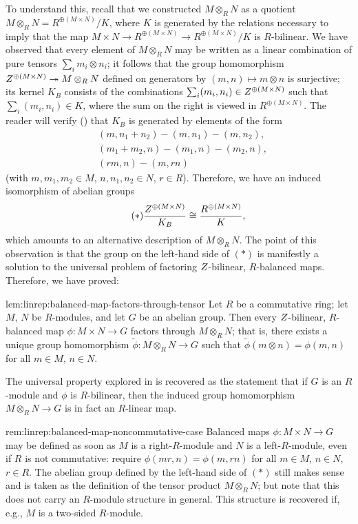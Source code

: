 To understand this, recall that we constructed $M \otimes_R N$ as a
quotient $M \otimes_R N = R^{\oplus(M \times N)}/K$, where $K$ is
generated by the relations necessary to imply that the map
$M \times N \to R^{\oplus(M \times N)} \to R^{\oplus(M \times N)}/K$
is $R$-bilinear. We have observed that every element of
$M \otimes_R N$ may be written as a linear combination of pure tensors
$\sum_i m_i \otimes n_i$; it follows that the group homomorphism
$Z^{\oplus(M \times N)} \twoheadrightarrow M \otimes_R N$ defined on
generators by $(m, n) \mapsto m \otimes n$ is surjective; its kernel
$K_B$ consists of the combinations
$\sum_i (m_i, n_i) \in Z^{\oplus(M \times N)}$ such that
$\sum_i (m_i, n_i) \in K$, where the sum on the right is viewed in
$R^{\oplus(M \times N)}$. The reader will verify
() that
$K_B$ is generated by elements of the form
\begin{align*}
  &(m, n_1 + n_2) - (m, n_1) - (m, n_2), \\
  &(m_1 + m_2, n) - (m_1, n) - (m_2, n), \\
  &(rm, n) - (m, rn)
\end{align*}
(with $m, m_1, m_2 \in M$, $n, n_1, n_2 \in N$, $r \in R$). Therefore,
we have an induced isomorphism of abelian groups
\[
  \tag{$*$} \frac{Z^{\oplus(M \times N)}}{K_B} \cong
  \frac{R^{\oplus(M \times N)}}{K},
\]
which amounts to an alternative description of $M \otimes_R N$. The
point of this observation is that the group on the left-hand side of
$(*)$ is manifestly a solution to the universal problem of factoring
$Z$-bilinear, $R$-balanced maps. Therefore, we have proved:

\begin{lem}{}{lem:linrep:balanced-map-factors-through-tensor}
  Let $R$ be a commutative ring; let $M$, $N$ be $R$-modules, and let
  $G$ be an abelian group. Then every $Z$-bilinear, $R$-balanced map
  $\phi : M \times N \to G$ factors through $M \otimes_R N$; that is,
  there exists a unique group homomorphism
  $\tilde\phi : M \otimes_R N \to G$ such that
  $\tilde\phi(m \otimes n) = \phi(m, n)$ for all $m \in M$, $n \in N$.
\end{lem}

The universal property explored in
is recovered as the statement that if $G$ is an $R$-module and $\phi$
is $R$-bilinear, then the induced group homomorphism
$M \otimes_R N \to G$ is in fact an $R$-linear map.
\begin{rem}{}{rem:linrep:balanced-map-noncommutative-case}
  Balanced maps $\phi : M \times N \to G$ may be defined as soon as
  $M$ is a right-$R$-module and $N$ is a left-$R$-module, even if $R$
  is not commutative: require $\phi(mr, n) = \phi(m, rn)$ for all
  $m \in M$, $n \in N$, $r \in R$. The abelian group defined by the
  left-hand side of $(*)$ still makes sense and is taken as the
  definition of the tensor product $M \otimes_R N$; but note that this
  does not carry an $R$-module structure in general. This structure is
  recovered if, e.g., $M$ is a two-sided $R$-module.
\end{rem}

